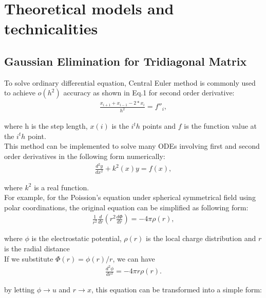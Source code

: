 \documentclass{article}
\begin{document}
	
	
\section{Theoretical models and technicalities}
\subsection{Gaussian Elimination for Tridiagonal Matrix}	
To solve ordinary differential equation, Central Euler method is commonly used to achieve $o(h^2)$ accuracy as shown in Eq.1 for second order derivative:\\

\begin{align}
\frac{x_{i+1}+x_{i-1}-2*x_i}{h^2} = f{''}_i,
\end{align}

where h is the step length, $x(i)$ is the $i^th$ points and $f$ is the function value at the $i^th$ point. \\
This method can be implemented to solve many ODEs involving first and second order derivatives in the following form numerically:\\

\begin{align}
\frac{d^2y}{dx^2}+k^2(x)y = f(x),
\end{align}

where $k^2$ is a real function.\\
For example, for the Poission's equation under spherical symmetrical field using polar coordinations, the original equation can be simplified as following form:\\

\begin{align}
\frac{1}{r^2}\frac{d}{dr}\left(r^2\frac{d\Phi}{dr}\right) = -4\pi \rho(r),
\end{align}

where $\phi$ is the electrostatic potential, $\rho(r)$ is the local charge distribution and $r$ is the radial distance\\
If we substitute $\Phi(r)= \phi(r)/r$, we can have \\

\begin{align}
\frac{d^2\phi}{dr^2}= -4\pi r\rho(r).
\end{align}

by letting $\phi\rightarrow u$ and $r\rightarrow x$, this equation can be transformed into a simple form:
\end{document}
